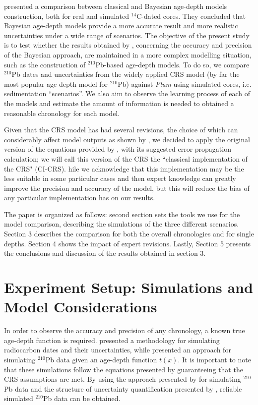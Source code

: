 \documentclass [10pt] {article}
\begin{document}
\citet{Blaauw2018} presented a comparison between classical and Bayesian age-depth models construction, both for real and simulated $^{14}$C-dated cores.
They concluded that Bayesian age-depth models provide a more accurate result and more realistic uncertainties under a wide range of scenarios.  
The objective of the present study is to test whether the results obtained by \citet{Blaauw2018}, concerning the accuracy and precision of the Bayesian approach, are maintained in a more complex modelling situation, such as the construction of $^{210}$Pb-based age-depth models.
To do so, we compare $^{210}$Pb dates and uncertainties from the widely applied CRS model (by far the most popular age-depth model for $^{210}$Pb) against \textit{Plum} using simulated cores, i.e. sedimentation ``scenarios''.
We also aim to observe the learning process of each of the models and estimate the amount of information is needed to obtained a reasonable chronology for each model. 

Given that the CRS model has had several revisions, the choice of which can considerably affect model outputs as shown by \citet{Barsanti2020}, we decided to apply the original version of the equations provided by \citet{Appleby2001}, with its suggested error propagation calculation; we will call this version of the CRS the ``classical implementation of the CRS" (CI-CRS). 
hile we acknowledge that this implementation may be the less suitable in some particular cases and then expert knowledge can greatly improve the precision and accuracy of the model, but this will reduce the bias of any particular implementation has on our results.

The paper is organized as follows: second section sets the tools we use for the model comparison, describing the simulations of the three different scenarios.
Section 3 describes the comparison for both the overall chronologies and for single depths.
Section 4 shows the impact of expert revisions.
Lastly, Section 5 presents the conclusions and discussion of the results obtained in section 3. 




\section{Experiment Setup: Simulations and Model Considerations}

	In order to observe the accuracy and precision of any chronology, a known true age-depth function is required.
\citet{Blaauw2018} presented a methodology for simulating radiocarbon dates and their uncertainties, while \citet{Aquino2018} presented an approach for simulating $^{210}$Pb data given an age-depth function $t(x)$.
It is important to note that these simulations follow the equations presented by \cite{Appleby1978, Robbins1978} guaranteeing that the CRS assumptions are met. 
By using the approach presented by \citet{Aquino2018} for simulating $^{210}$Pb data and the structure of uncertainty quantification presented by \citet{Blaauw2018}, reliable simulated $^{210}$Pb data can be obtained.
\end{document}
